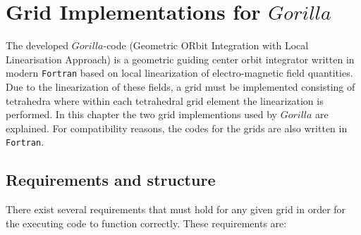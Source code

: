 \documentclass[./main.tex]{subfiles}
\begin{document}
\chapter{Grid Implementations for $Gorilla$}%
\label{chap:GRID}
The developed $Gorilla$-code (Geometric ORbit Integration with Local Linearisation Approach) is a geometric guiding center orbit integrator written in modern \texttt{Fortran} based on local linearization of electro-magnetic field quantities. Due to the linearization of these fields, a grid must be implemented consisting of tetrahedra where within each tetrahedral grid element the linearization is performed. In this chapter the two grid implementions used by $Gorilla$ are explained. For compatibility reasons, the codes for the grids are also written in \texttt{Fortran}. 

\section{Requirements and structure}

There exist several requirements that must hold for any given grid in order for the executing code to function correctly. These requirements are: 
\end{document}
